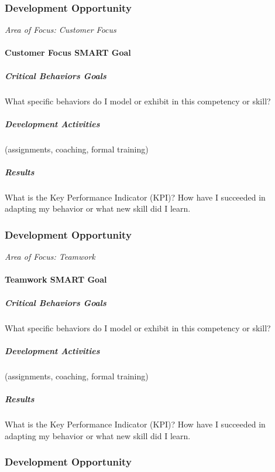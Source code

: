     
    
    
    
\subsubsection*{Development Opportunity}
    
\textit{Area of Focus: Customer Focus}
\paragraph{Customer Focus SMART Goal}    
\subparagraph{Critical Behaviors Goals}

What specific behaviors do I model or exhibit in this competency or skill? 
\vspace{.3in}

\subparagraph{Development Activities}

(assignments, coaching, formal training)
\vspace{.3in}

\subparagraph{Results}

What is the Key Performance Indicator (KPI)? How have I succeeded in adapting my behavior or what new skill did I learn.      
\clearpage



\subsubsection*{Development Opportunity}
\textit{Area of Focus: Teamwork}
\paragraph{Teamwork SMART Goal}   
\subparagraph{Critical Behaviors Goals}

What specific behaviors do I model or exhibit in this competency or skill? 
\vspace{.3in}

\subparagraph{Development Activities}

(assignments, coaching, formal training)
\vspace{.3in}

\subparagraph{Results}

What is the Key Performance Indicator (KPI)? How have I succeeded in adapting my behavior or what new skill did I learn.       
\clearpage




\subsubsection*{Development Opportunity}

